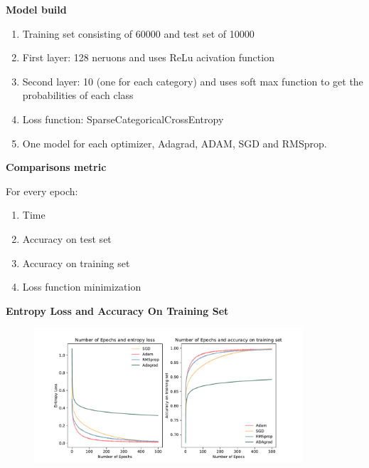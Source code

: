 \documentclass{beamer}
\newcommand\myheading[1]{%
  \par\bigskip
  {\Large\bfseries#1}\par\smallskip}
\begin{document}
\begin{frame}
    \myheading{Model build}
    \begin{enumerate}
        \item{Training set consisting of 60000 and test set of 10000}
        \item First layer: 128 neruons and uses ReLu acivation function
        \item Second layer: 10 (one for each category) and uses soft max function to get the probabilities of each class
        \item Loss function: SparseCategoricalCrossEntropy
        \item One model for each optimizer, Adagrad, ADAM, SGD and RMSprop. 
    \end{enumerate}
\end{frame}

\begin{frame}
    \myheading{Comparisons metric}
    For every epoch:
    \begin{enumerate}
        \item Time
        \item Accuracy on test set 
        \item Accuracy on training set
        \item Loss function minimization
    \end{enumerate}
\end{frame}


\begin{frame}
    \myheading{Entropy Loss and Accuracy On Training Set}
    \begin{figure}[h]
        \includegraphics[width=10cm]{report/figures/accuracy_training_and_entropy.pdf}
    \end{figure}
\end{frame}
\end{document}
